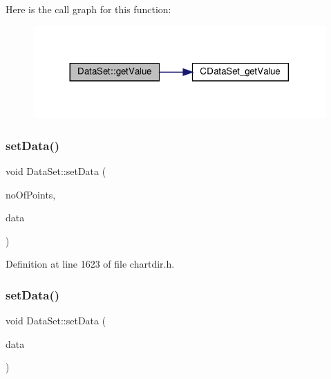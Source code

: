 Here is the call graph for this function\+:
\nopagebreak
\begin{figure}[H]
\begin{center}
\leavevmode
\includegraphics[width=317pt]{class_data_set_aa6fb7ec40666c6773515831ebcb6235e_cgraph}
\end{center}
\end{figure}
\mbox{\label{class_data_set_a05a36bed4b2e5d0ad7bc7d6f44507f0c}} 
\subsubsection{\texorpdfstring{set\+Data()}{setData()}\hspace{0.1cm}{\footnotesize\ttfamily [1/2]}}
{\footnotesize\ttfamily void Data\+Set\+::set\+Data (\begin{DoxyParamCaption}\item[{int}]{no\+Of\+Points,  }\item[{const double $\ast$}]{data }\end{DoxyParamCaption})\hspace{0.3cm}{\ttfamily [inline]}}



Definition at line 1623 of file chartdir.\+h.

\mbox{\label{class_data_set_a059176a28d82a9524ff8b4687becd719}} 
\subsubsection{\texorpdfstring{set\+Data()}{setData()}\hspace{0.1cm}{\footnotesize\ttfamily [2/2]}}
{\footnotesize\ttfamily void Data\+Set\+::set\+Data (\begin{DoxyParamCaption}\item[{\hyperlink{class_double_array}{Double\+Array}}]{data }\end{DoxyParamCaption})\hspace{0.3cm}{\ttfamily [inline]}}



